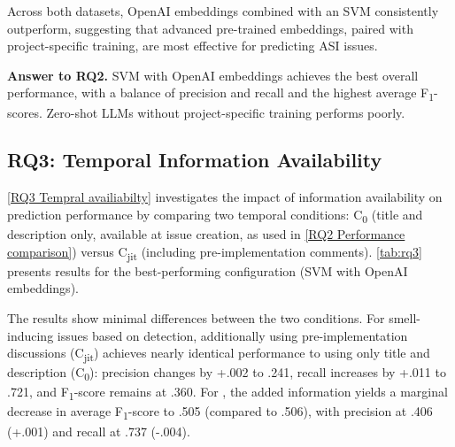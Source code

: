 Across both datasets, OpenAI embeddings combined with an \ac{SVM} consistently outperform, suggesting that advanced pre-trained embeddings, paired with project-specific training, are most effective for predicting \ac{ASI} issues.

\begin{rqanswer}
    \textbf{Answer to RQ2. }
    \ac{SVM} with OpenAI embeddings achieves the best overall performance, with a balance of precision and recall and the highest average F\textsubscript{1}-scores.
    Zero-shot \acp{LLM} without project-specific training performs poorly.
\end{rqanswer}



\subsection{RQ3: Temporal Information Availability}


\ref{RQ3 Tempral availiabilty} investigates the impact of information availability on prediction performance by comparing two temporal conditions: C\textsubscript{0} (title and description only, available at issue creation, as used in \ref{RQ2 Performance comparison}) versus C\textsubscript{jit} (including pre-implementation comments).
\autoref{tab:rq3} presents results for the best-performing configuration (SVM with OpenAI embeddings).

The results show minimal differences between the two conditions.
For smell-inducing issues based on \ARCADE detection, additionally using pre-implementation discussions (C\textsubscript{jit}) achieves nearly identical performance to using only title and description (C\textsubscript{0}): precision changes by +.002 to .241, recall increases by +.011 to .721, and F\textsubscript{1}-score remains at .360.
For \Arcan, the added information yields a marginal decrease in average F\textsubscript{1}-score to .505 (compared to .506), with precision at .406 (+.001) and recall at .737 (-.004).


